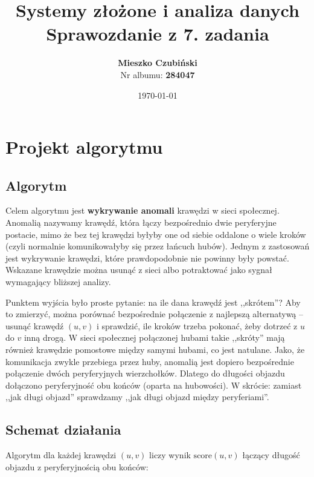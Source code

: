 \documentclass[12pt]{article}
\title{\textbf{Systemy złożone i analiza danych} \\ \textbf{Sprawozdanie z 7. zadania}}
\author{\textbf{Mieszko Czubiński} \\ Nr albumu: \textbf{284047}}
\date{\today}
\begin{document}
\maketitle

\section{Projekt algorytmu}

\subsection{Algorytm}

Celem algorytmu jest \textbf{wykrywanie anomali} krawędzi w sieci społecznej. Anomalią nazywamy krawędź, która łączy bezpośrednio dwie peryferyjne postacie, mimo że bez tej krawędzi byłyby one od siebie oddalone o wiele kroków (czyli normalnie komunikowałyby się przez łańcuch hubów). Jednym z zastosowań jest wykrywanie krawędzi, które prawdopodobnie nie powinny były powstać. Wskazane krawędzie można usunąć z sieci albo potraktować jako sygnał wymagający bliższej analizy.

Punktem wyjścia było proste pytanie: na ile dana krawędź jest ,,skrótem''? Aby to zmierzyć, można porównać bezpośrednie połączenie z najlepszą alternatywą -- usunąć krawędź $(u,v)$ i sprawdzić, ile kroków trzeba pokonać, żeby dotrzeć z $u$ do $v$ inną drogą. W sieci społecznej połączonej hubami takie ,,skróty'' mają również krawędzie pomostowe między samymi hubami, co jest natulane. Jako, że komunikacja zwykle przebiega przez huby, anomalią jest dopiero bezpośrednie połączenie dwóch peryferyjnych wierzchołków. Dlatego do długości objazdu dołączono peryferyjność obu końców (oparta na hubowości). W skrócie: zamiast ,,jak długi objazd'' sprawdzamy ,,jak długi objazd między peryferiami''.

\subsection{Schemat działania}

Algorytm dla każdej krawędzi $(u,v)$ liczy wynik $\mathrm{score}(u,v)$ łączący długość objazdu z peryferyjnością obu końców:
\end{document}
